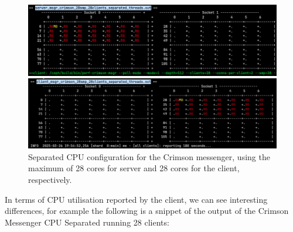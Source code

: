 \begin{figure}[!ht]
  \centering
  \begin{minipage}{.5\textwidth}
  \centering
    \includegraphics[width=\textwidth]{server_msgr_crimson_28smp_28clients_separated_threads.png}
  \end{minipage}%
  \begin{minipage}{.5\textwidth}
  \centering
    \includegraphics[width=\textwidth]{client_msgr_crimson_28smp_28clients_separated_threads.png}
  \end{minipage}%
  \caption{Separated CPU configuration for the Crimson messenger, using the maximum of 28
  cores for server and 28 cores for the client, respectively.}
  \label{figure:crimson_sep_28}
\end{figure}

In terms of CPU utilisation reported by the client, we can see interesting
differences, for example the following is a snippet of the output of the
Crimson Messenger CPU Separated running 28 clients:

